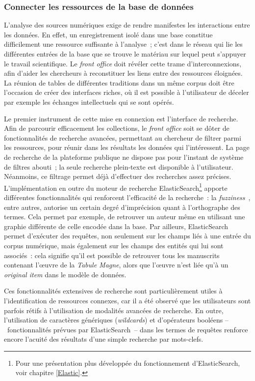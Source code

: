 \documentclass[a4paper,12pt,twoside]{book}
\newcommand{\eng}{\emph}
\newcommand{\oi}{\eng{original item}\xspace}
\newcommand{\fo}{\eng{front office}\xspace}
\newcommand{\g}[1]{\og#1~\fg}
\begin{document}
			\subsubsection{Connecter les ressources de la base de données}
L'analyse des sources numériques exige de rendre manifestes les interactions entre les données. En effet, un enregistrement isolé dans une base constitue difficilement une ressource suffisante à l'analyse~; c'est dans le réseau qui lie les différentes entrées de la base que se trouve le matériau sur lequel peut s'appuyer le travail scientifique. Le \fo doit révéler cette trame d'interconnexions, afin d'aider les chercheurs à reconstituer les liens entre des ressources éloignées. La réunion de tables de différentes traditions dans un même corpus doit être l'occasion de créer des interfaces riches, où il est possible à l'utilisateur de déceler par exemple les échanges intellectuels qui se sont opérés.

Le premier instrument de cette mise en connexion est l'interface de recherche. Afin de parcourir efficacement les collections, le \fo soit se dôter de fonctionnalités de recherche avancées, permettant au chercheur de filtrer parmi les ressources, pour réunir dans les résultats les données qui l'intéressent. La page de recherche de la plateforme publique ne dispose pas pour l'instant de système de filtres abouti~; la seule recherche plein-texte est disponible à l'utilisateur. Néanmoins, ce filtrage permet déjà d'effectuer des recherches assez précises. L'implémentation en outre du moteur de recherche ElasticSearch\footnote{Pour une présentation plus développée du fonctionnement d'ElasticSearch, voir chapitre \ref{Elastic}.} apporte différentes fonctionnalités qui renforcent l'efficacité de la recherche~: la \g{\eng{fuzziness}}, entre autres, autorise un certain degré d'imprécision quant à l'orthographe des termes. Cela permet par exemple, de retrouver un auteur même en utilisant une graphie différente de celle encodée dans la base. Par ailleurs, ElasticSearch permet d'exécuter des requêtes, non seulement sur les champs liés à une entrée du corpus numérique, mais également sur les champs des entités qui lui sont associés~: cela signifie qu'il est possible de retrouver tous les manuscrits contenant l'œuvre de la \emph{Tabule Magne}, alors que l'œuvre n'est liée qu'à un \oi dans le modèle de données.

Ces fonctionnalités extensives de recherche sont particulièrement utiles à l'identification de ressources connexes, car il a été observé que les utilisateurs sont parfois rétifs à l'utilisation de modalités avancées de recherche. En outre, l'utilisation de caractères génériques (\eng{wildcards}) et d'opérateurs booléens –~fonctionnalités prévues par ElasticSearch~– dans les termes de requêtes renforce encore l'acuité des résultats d'une simple recherche par mots-clefs.
\end{document}

